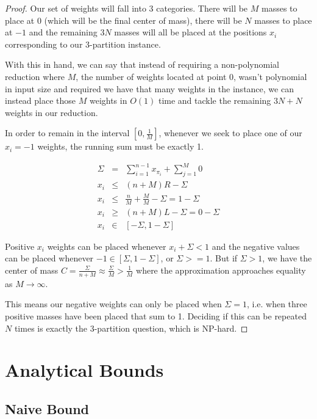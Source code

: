 \begin{proof}
Our set of weights will fall into 3 categories.  There will be $M$ masses to place at 0 (which will be the final center of mass), there will be $N$ masses to place at $-1$ and the remaining $3N$ masses will all be placed at the positions $x_i$ corresponding to our 3-partition instance.

With this in hand, we can say that instead of requiring a non-polynomial reduction where $M$, the number of weights located at point 0, wasn't polynomial in input size and required we have that many weights in the instance, we can instead place those $M$ weights in $ O(1) $ time and tackle the remaining $ 3N + N$ weights in our reduction.

In order to remain in the interval $[0, \frac{1}{M}]$, whenever we seek to place one of our $x_i = -1$ weights, the running sum must be exactly 1.

\begin{eqnarray*}
\Sigma &=& \sum_{i=1}^{n-1} x_{\pi_i} + \sum_{j=1}^M 0 \\
x_i &\leq& (n+M) R - \Sigma \\
x_i &\leq& \frac{n}{M} + \frac{M}{M}- \Sigma = 1 - \Sigma \\
x_i &\geq& (n+M) L - \Sigma = 0 - \Sigma \\
x_i &\in& [ - \Sigma, 1 - \Sigma ]
\end{eqnarray*}

Positive $x_i$ weights can be placed whenever $x_i + \Sigma < 1$ and the negative values can be placed whenever $ -1 \in [\Sigma, 1-\Sigma] $, or $ \Sigma >= 1$.  But if $ \Sigma > 1$, we have the center of mass $ C = \frac{\Sigma}{n+M} \approx \frac{\Sigma}{M} > \frac{1}{M}$ where the approximation approaches equality as $ M \rightarrow \infty$.

This means our negative weights can only be placed when $\Sigma = 1$, i.e. when three positive masses have been placed that sum to 1.  Deciding if this can be repeated $N$ times is exactly the 3-partition question, which is NP-hard.
\end{proof}

\section{Analytical Bounds}

\subsection{Naive Bound}


